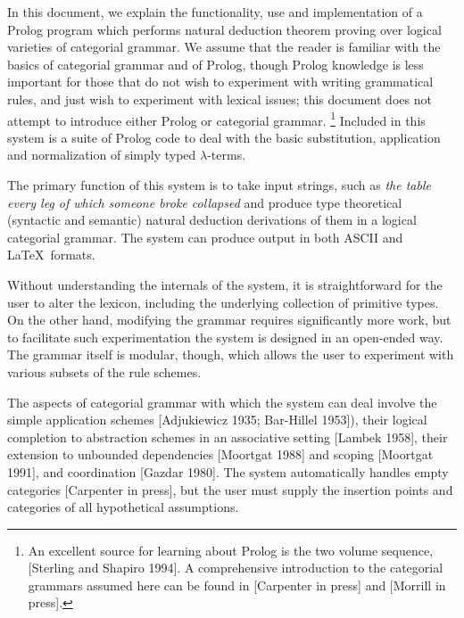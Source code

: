 \thispagestyle{empty}

\hfill

\tableofcontents

\clearpage

\setcounter{page}{1}


In this document, we explain the functionality, use and implementation
of a Prolog program which performs natural deduction theorem proving
over logical varieties of categorial grammar.  We assume that the
reader is familiar with the basics of categorial grammar and of
Prolog, though Prolog knowledge is less important for those that do
not wish to experiment with writing grammatical rules, and just wish
to experiment with lexical issues; this document does not attempt to
introduce either Prolog or categorial grammar.%
%
\footnote{An excellent source for learning about Prolog is the two
volume sequence, [Sterling and Shapiro 1994].  A
comprehensive introduction to the categorial grammars assumed here can
be found in [Carpenter in press] and [Morrill in press].}
%
Included in this system is a suite of Prolog code to deal with the
basic substitution, application and normalization of simply typed
$\lambda$-terms.

The primary function of this system is to take input strings, such as
{\it the table every leg of which someone broke collapsed} and produce
type theoretical (syntactic and semantic) natural deduction
derivations of them in a logical categorial grammar.  The system can
produce output in both ASCII and \LaTeX\ formats.

Without understanding the internals of the system, it is
straightforward for the user to alter the lexicon, including the
underlying collection of primitive types.  On the other hand,
modifying the grammar requires significantly more work, but to
facilitate such experimentation the system is designed in an
open-ended way.  The grammar itself is modular, though, which allows the user to
experiment with various subsets of the rule schemes.

The aspects of categorial grammar with which the system can deal
involve the simple application schemes [Adjukiewicz 1935; Bar-Hillel
1953]), their logical completion to abstraction schemes in an
associative setting [Lambek 1958], their extension to unbounded
dependencies [Moortgat 1988] and scoping [Moortgat 1991], and
coordination [Gazdar 1980].  The system automatically handles empty
categories [Carpenter in press], but the user must supply the
insertion points and categories of all hypothetical assumptions.

